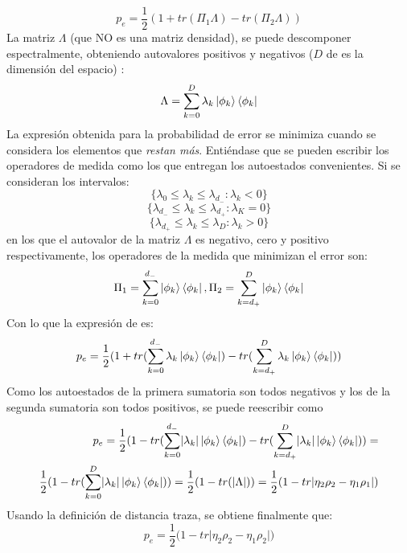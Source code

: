 \documentclass{book}
\begin{document}
\begin{equation}{p_e=\frac{1}{2}(1+tr(\Pi_1\Lambda)-tr(\Pi_2\Lambda))}\end{equation}
La matriz $\Lambda$ (que {NO es una matriz densidad}), se puede descomponer espectralmente, obteniendo autovalores positivos y negativos (${D}$ de es la dimensión del espacio) :
\begin{equation}{\Lambda=\sum_{k=0}^D \lambda_k\ket{\phi_k}\bra{\phi_k}}\end{equation}
La expresión obtenida para la probabilidad de error se minimiza cuando se considera los elementos que \textit{restan más}. Entiéndase que se pueden escribir los operadores de medida como los que entregan los autoestados convenientes.
Si se consideran los intervalos:
\begin{equation}{\{ \lambda_0 \leq \lambda_k \leq \lambda_{d_-} : \lambda_k <0 \}}\end{equation}
\begin{equation}{\{ \lambda_{d_-} \leq \lambda_k \leq \lambda_{d_+} : \lambda_K =0 \}}\end{equation}
\begin{equation}{\{ \lambda_{d_+} \leq \lambda_k \leq \lambda_D : \lambda_k >0 \}}\end{equation}
en los que el autovalor de la matriz ${\Lambda}$ es negativo, cero y positivo respectivamente, los operadores de la medida que minimizan el error son:
\begin{equation}{\Pi_1=\sum_{k=0}^{d_-}\ket{\phi_k}\bra{\phi_k},\Pi_2=\sum_{k=d_+}^{D}\ket{\phi_k}\bra{\phi_k} }\end{equation}
Con lo que la expresión de  es:
\begin{equation}{p_e=\frac{1}{2}(1+tr(\sum_{k=0}^{d_-} \lambda_k\ket{\phi_k}\bra{\phi_k})-tr(\sum_{k=d_+}^{D} \lambda_k\ket{\phi_k}\bra{\phi_k}))}\end{equation}
Como los autoestados de la primera sumatoria son todos negativos y los de la segunda sumatoria son todos positivos, se puede reescribir como
\begin{equation}\begin{aligned}{p_e=\frac{1}{2}(1-tr(\sum_{k=0}^{d_-}\lvert\lambda_k\rvert\ket{\phi_k}\bra{\phi_k})-tr(\sum_{k=d_+}^{D} \lvert\lambda_k\rvert\ket{\phi_k}\bra{\phi_k}))=} \\ {\frac{1}{2}(1-tr(\sum_{k=0}^{D}\lvert\lambda_k\rvert\ket{\phi_k}\bra{\phi_k}))=\frac{1}{2}(1-tr(\lvert\Lambda\rvert))=\frac{1}{2}(1-tr\lvert\eta_2\rho_2-\eta_1\rho_1\rvert)}\end{aligned}\end{equation}
Usando la definición de distancia traza, se obtiene finalmente que:
\begin{equation} {p_e=\frac{1}{2}(1-tr\lvert\eta_2\rho_2-\eta_1\rho_2\rvert}) \end{equation}
\end{document}
